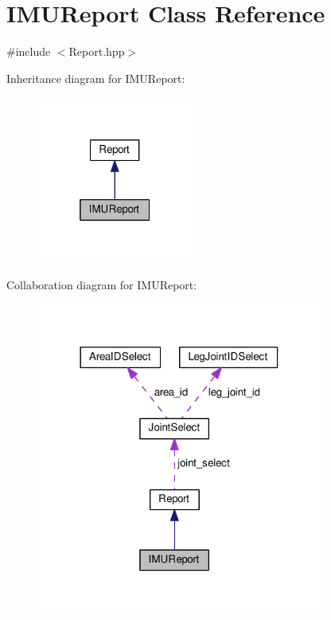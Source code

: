 \hypertarget{classIMUReport}{}\section{I\+M\+U\+Report Class Reference}
\label{classIMUReport}


{\ttfamily \#include $<$Report.\+hpp$>$}



Inheritance diagram for I\+M\+U\+Report\+:\nopagebreak
\begin{figure}[H]
\begin{center}
\leavevmode
\includegraphics[width=145pt]{classIMUReport__inherit__graph}
\end{center}
\end{figure}


Collaboration diagram for I\+M\+U\+Report\+:\nopagebreak
\begin{figure}[H]
\begin{center}
\leavevmode
\includegraphics[width=266pt]{classIMUReport__coll__graph}
\end{center}
\end{figure}
